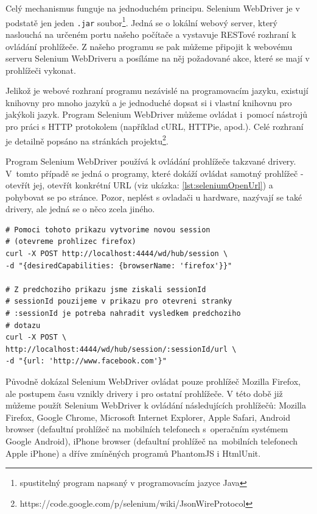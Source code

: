 \documentclass[thesis=M,czech]{FITthesis}[2013/05/10]
\begin{document}
Celý mechanismus funguje na jednoduchém principu. Selenium WebDriver je v podstatě jen jeden \verb|.jar| soubor\footnote{spustitelný program napsaný v programovacím jazyce Java}. Jedná se o lokální webový server, který naslouchá na určeném portu našeho počítače a vystavuje RESTové rozhraní k ovládání prohlížeče. Z našeho programu se pak můžeme připojit k webovému serveru Selenium WebDriveru a posíláme na něj požadované akce, které se mají v prohlížeči vykonat. 

Jelikož je webové rozhraní programu nezávislé na programovacím jazyku, existují knihovny pro mnoho jazyků a je jednoduché dopsat si i vlastní knihovnu pro jakýkoli jazyk. Program Selenium WebDriver můžeme ovládat i~pomocí nástrojů pro práci s HTTP protokolem (například cURL, HTTPie, apod.). Celé rozhraní je detailně popsáno na stránkách projektu\footnote{https://code.google.com/p/selenium/wiki/JsonWireProtocol}.

Program Selenium WebDriver používá k ovládání prohlížeče takzvané drivery. V~tomto případě se jedná o programy, které dokáží ovládat samotný prohlížeč - otevřít jej, otevřít konkrétní URL (viz ukázka: \ref{lst:seleniumOpenUrl}) a pohybovat se po stránce. Pozor, neplést s ovladači u hardware, nazývají se také drivery, ale jedná se o něco zcela jiného. 

\begin{lstlisting}[caption={Příklad otevření URL v programu Selenium WebDriver pomocí cURL},label=lst:seleniumOpenUrl,belowcaptionskip=0.4cm]
# Pomoci tohoto prikazu vytvorime novou session 
# (otevreme prohlizec firefox)
curl -X POST http://localhost:4444/wd/hub/session \
-d "{desiredCapabilities: {browserName: 'firefox'}}"

# Z predchoziho prikazu jsme ziskali sessionId
# sessionId pouzijeme v prikazu pro otevreni stranky
# :sessionId je potreba nahradit vysledkem predchoziho
# dotazu
curl -X POST \
http://localhost:4444/wd/hub/session/:sessionId/url \
-d "{url: 'http://www.facebook.com'}" 
\end{lstlisting}

Původně dokázal Selenium WebDriver ovládat pouze prohlížeč Mozilla Firefox, ale postupem času vznikly drivery i pro ostatní prohlížeče. V této době již můžeme použít Selenium WebDriver k ovládání následujících prohlížečů: Mozilla Firefox, Google Chrome, Microsoft Internet Explorer, Apple Safari, Android browser (defaultní prohlížeč na mobilních telefonech s~operačním systémem Google Android), iPhone browser (defaultní prohlížeč na~mobilních telefonech Apple iPhone) a dříve zmíněných programů PhantomJS i HtmlUnit. 
\end{document}
